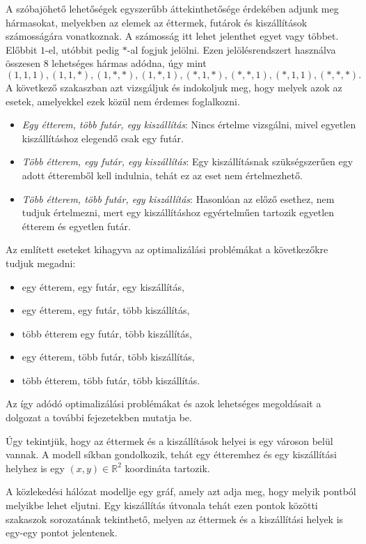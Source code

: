 
A szóbajöhető lehetőségek egyszerűbb áttekinthetősége érdekében adjunk meg hármasokat, melyekben az elemek az éttermek, futárok és kiszállítások számosságára vonat\-koznak.
A számosság itt lehet jelenthet egyet vagy többet. Előbbit $1$-el, utóbbit pedig $*$-al fogjuk jelölni.
Ezen jelölésrendszert használva összesen 8 lehetséges hármas adódna, úgy mint
\[
(1, 1, 1),
(1, 1, *),
(1, *, *),
(1, *, 1),
(*, 1, *),
(*, *, 1),
(*, 1, 1),
(*, *, *).
\]
A következő szakaszban azt vizsgáljuk és indokoljuk meg, hogy melyek azok az esetek, amelyekkel ezek közül nem érdemes foglalkozni.


\begin{itemize}
\item \textit{Egy étterem, több futár, egy kiszállítás}:
Nincs értelme vizsgálni, mivel egyetlen kiszállításhoz elegendő csak egy futár.
\item \textit{Több étterem, egy futár, egy kiszállítás}: Egy kiszállításnak szükségszerűen egy adott étteremből kell indulnia, tehát ez az eset nem értelmezhető.
\item \textit{Több étterem, több futár, egy kiszállítás}: Hasonlóan az előző esethez, nem tudjuk értelmezni, mert egy kiszállításhoz egyértelműen tartozik egyetlen étterem és egyetlen futár.
\end{itemize}

Az említett eseteket kihagyva az optimalizálási problémákat a következőkre tudjuk megadni:
\begin{itemize}
\item egy étterem, egy futár, egy kiszállítás,
\item egy étterem, egy futár, több kiszállítás,
\item több étterem egy futár, több kiszállítás,
\item egy étterem, több futár, több kiszállítás,
\item több étterem, több futár, több kiszállítás.
\end{itemize}
Az így adódó optimalizálási problémákat és azok lehetséges megoldásait a dolgozat a további fejezetekben mutatja be.


Úgy tekintjük, hogy az éttermek és a kiszállítások helyei is egy városon belül vannak.
A modell síkban gondolkozik, tehát egy étteremhez és egy kiszállítási helyhez is egy $(x, y) \in \mathbb{R}^2$ koordináta tartozik.

A közlekedési hálózat modellje egy gráf, amely azt adja meg, hogy melyik pontból melyikbe lehet eljutni.
Egy kiszállítás útvonala tehát ezen pontok közötti szakaszok sorozatának tekinthető, melyen az éttermek és a kiszállítási helyek is egy-egy pontot jelentenek.
